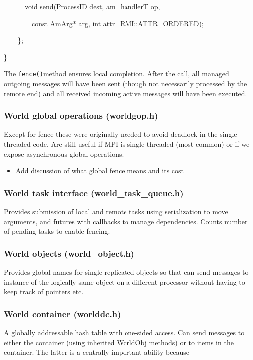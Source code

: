 \documentclass[letterpaper]{article}
\newcommand\liststyleLvii{%
\renewcommand\labelitemi{${\bullet}$}
\renewcommand\labelitemii{${\circ}$}
\renewcommand\labelitemiii{${\blacksquare}$}
\renewcommand\labelitemiv{${\bullet}$}
}
\begin{document}
{\ttfamily
\ \ \ \ \ \ void send(ProcessID dest, am\_handlerT op, }

{\ttfamily
\ \ \ \ \ \ \ \ const AmArg* arg, int attr=RMI::ATTR\_ORDERED);}

{\ttfamily
\ \ \ \ \};}

{\ttfamily
\}}


\bigskip

The \texttt{fence()}method ensures local completion. After the call, all managed outgoing messages will have been sent
(though not necessarily processed by the remote end) and all received incoming active messages will have been executed.

\subsubsection{World global operations (worldgop.h)}
Except for fence these were originally needed to avoid deadlock in the single threaded code. Are still useful if MPI is
single-threaded (most common) or if we expose asynchronous global operations.

\liststyleLvii
\begin{itemize}
\item Add discussion of what global fence means and its cost
\end{itemize}

\bigskip

\subsubsection{World task interface (world\_task\_queue.h)}
Provides submission of local and remote tasks using serialization to move arguments, and futures with callbacks to
manage dependencies. Counts number of pending tasks to enable fencing.

\subsubsection{World objects (world\_object.h)}
Provides global names for single replicated objects so that can send messages to instance of the logically same object
on a different processor without having to keep track of pointers etc.

\subsubsection[World container (worlddc.h)]{World container (worlddc.h)}
A globally addressable hash table with one-sided access. Can send messages to either the container (using inherited
WorldObj methods) or to items in the container. The latter is a centrally important ability because
\end{document}
